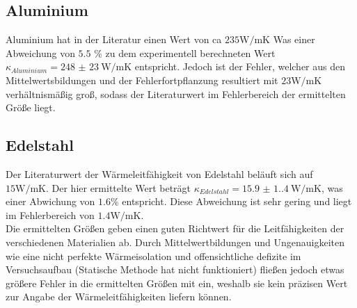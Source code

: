 \subsection{Aluminium}
\noindent Aluminium hat in der Literatur einen Wert von ca $235 \unit{\watt\per\meter\kelvin}$ 
Was einer Abweichung von $5.5$ \% zu dem experimentell berechneten Wert
$\kappa_{Aluminium} = \qty{248(23)}{\watt\per\meter\kelvin}$ 
entspricht. Jedoch ist der Fehler, welcher aus den Mittelwertsbildungen und 
der Fehlerfortpflanzung resultiert mit $ 23 \unit{\watt\per\meter\kelvin}$
verhältnismäßig groß, sodass der Literaturwert im Fehlerbereich der
ermittelten Größe liegt.
\subsection{Edelstahl}
\noindent Der Literaturwert der Wärmeleitfähigkeit von Edelstahl beläuft sich 
auf $15 \unit{\watt\per\meter\kelvin}$. Der hier ermittelte Wert beträgt
$\kappa_{Edelstahl} = \qty{15.9(1.4)}{\watt\per\meter\kelvin}$, was einer 
Abwichung von $1.6 \% $ entspricht. Diese Abweichung ist sehr gering und
liegt im Fehlerbereich von $1.4 \unit{\watt\per\meter\kelvin}$.\\[0.2cm]

\noindent Die ermittelten Größen geben einen guten Richtwert für die 
Leitfähigkeiten der verschiedenen Materialien ab. Durch Mittelwertbildungen
und Ungenauigkeiten wie eine nicht perfekte Wärmeisolation und 
offensichtliche defizite im Versuchsaufbau (Statische Methode hat nicht
funktioniert) fließen jedoch etwas größere Fehler in die ermittelten Größen mit 
ein, weshalb sie kein präzisen Wert zur Angabe der Wärmeleitfähigkeiten liefern
können.